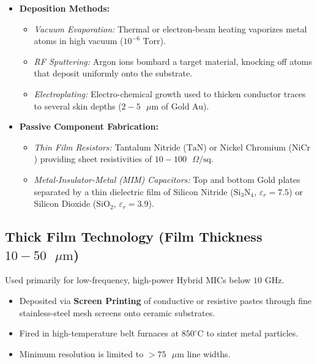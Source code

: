 \documentclass[10pt,a4paper]{article}
\begin{document}
\begin{itemize}[leftmargin=*, itemsep=4pt]
  \item \textbf{Deposition Methods:}
    \begin{itemize}[leftmargin=*, noitemsep]
      \item \textit{Vacuum Evaporation:} Thermal or electron-beam heating vaporizes metal atoms in high vacuum ($10^{-6}\text{ Torr}$).
      \item \textit{RF Sputtering:} Argon ions bombard a target material, knocking off atoms that deposit uniformly onto the substrate.
      \item \textit{Electroplating:} Electro-chemical growth used to thicken conductor traces to several skin depths ($2-5\text{ }\mu\text{m}$ of Gold Au).
    \end{itemize}
  \item \textbf{Passive Component Fabrication:}
    \begin{itemize}[leftmargin=*, noitemsep]
      \item \textit{Thin Film Resistors:} Tantalum Nitride ($\text{TaN}$) or Nickel Chromium ($\text{NiCr}$) providing sheet resistivities of $10 - 100\text{ }\Omega/\text{sq}$.
      \item \textit{Metal-Insulator-Metal (MIM) Capacitors:} Top and bottom Gold plates separated by a thin dielectric film of Silicon Nitride ($\text{Si}_3\text{N}_4$, $\varepsilon_r=7.5$) or Silicon Dioxide ($\text{SiO}_2$, $\varepsilon_r=3.9$).
    \end{itemize}
\end{itemize}

\subsection{Thick Film Technology (Film Thickness \texorpdfstring{$10 - 50\text{ }\mu\text{m}$}{10 - 50 um})}
Used primarily for low-frequency, high-power Hybrid MICs below $10\text{ GHz}$.
\begin{itemize}[leftmargin=*, itemsep=3pt]
  \item Deposited via \textbf{Screen Printing} of conductive or resistive pastes through fine stainless-steel mesh screens onto ceramic substrates.
  \item Fired in high-temperature belt furnaces at $850^\circ\text{C}$ to sinter metal particles.
  \item Minimum resolution is limited to $>75\text{ }\mu\text{m}$ line widths.
\end{itemize}
\end{document}
